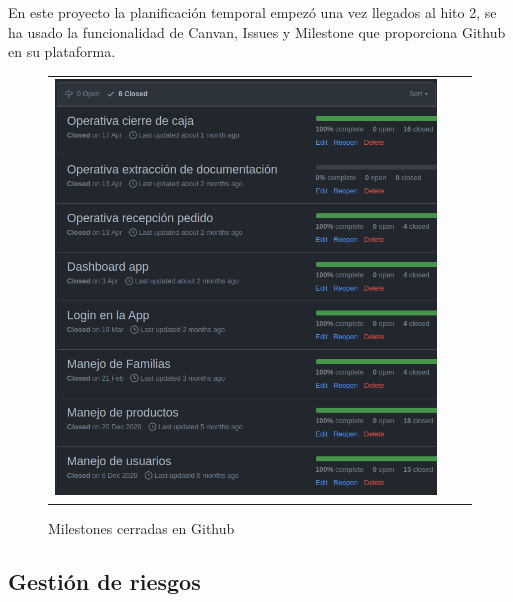\vspace{1em}
\par En este proyecto la planificación temporal empezó una vez llegados al hito 2, se ha usado la funcionalidad de Canvan, Issues y Milestone que proporciona Github en su plataforma.
\begin{figure}[h]
\centering
\begin{tabular}{ccc}
\includegraphics[scale=0.62]{archivos/github_milestones.png}
\end{tabular}
\caption{Milestones cerradas en Github}
\label{fig:github_milestones}
\end{figure}
\clearpage
\subsection{Gestión de riesgos}